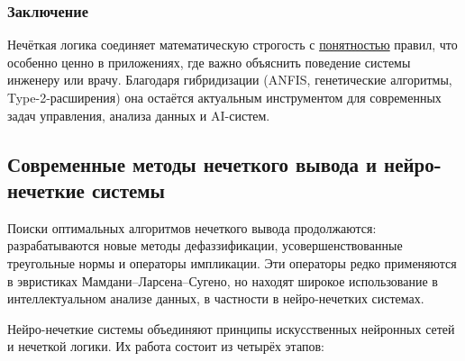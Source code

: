 \subsubsection{Заключение}
Нечёткая логика соединяет
математическую строгость с \underline{понятностью} правил,
что особенно ценно в приложениях,
где важно объяснить поведение системы инженеру или врачу.
Благодаря гибридизации (ANFIS, генетические алгоритмы,
Type-2-расширения) она остаётся актуальным
инструментом для современных задач
управления, анализа данных и AI-систем.

\subsection{Современные методы нечеткого вывода и нейро-нечеткие системы}
\label{sec:advanced_inference}

Поиски оптимальных алгоритмов нечеткого вывода продолжаются: разрабатываются
новые методы дефаззификации, усовершенствованные треугольные нормы
и операторы импликации. Эти операторы редко применяются в
эвристиках Мамдани–Ларсена–Сугено, но находят широкое использование в
интеллектуальном анализе данных, в частности в нейро-нечетких
системах.

Нейро-нечеткие системы объединяют принципы искусственных нейронных сетей и
нечеткой логики. Их работа состоит из четырёх этапов:

